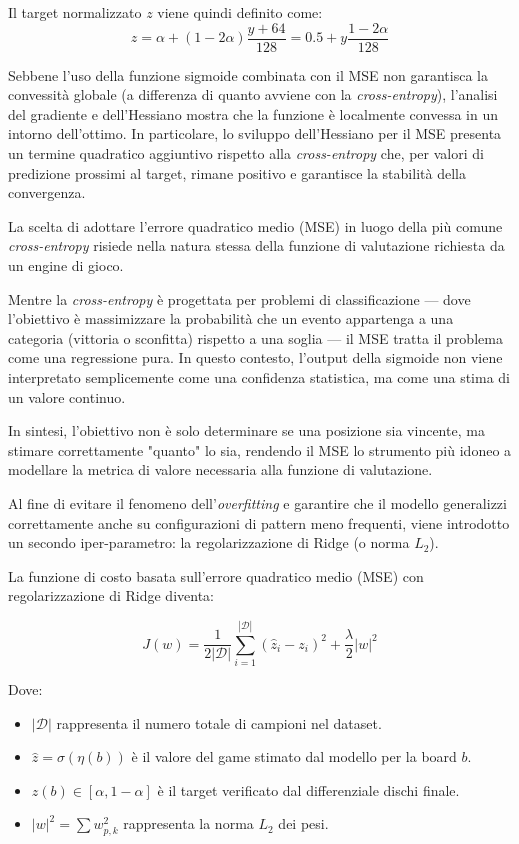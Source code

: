 Il target normalizzato $z$ viene quindi definito come:
\begin{equation}
    z = \alpha + (1 - 2\alpha) \frac{y + 64}{128} = 0.5 + y \frac{1 - 2\alpha}{128}
\end{equation}

Sebbene l'uso della funzione sigmoide combinata con il MSE non garantisca la convessità globale (a differenza di quanto avviene con la \textit{cross-entropy}), l'analisi del gradiente e dell'Hessiano mostra che la funzione è localmente convessa in un intorno dell'ottimo. In particolare, lo sviluppo dell'Hessiano per il MSE presenta un termine quadratico aggiuntivo rispetto alla \textit{cross-entropy} che, per valori di predizione prossimi al target, rimane positivo e garantisce la stabilità della convergenza.

La scelta di adottare l'errore quadratico medio (MSE) in luogo della più comune \textit{cross-entropy} risiede nella natura stessa della funzione di valutazione richiesta da un engine di gioco.

Mentre la \textit{cross-entropy} è progettata per problemi di classificazione — dove l'obiettivo è massimizzare la probabilità che un evento appartenga a una categoria (vittoria o sconfitta) rispetto a una soglia — il MSE tratta il problema come una regressione pura.
In questo contesto, l'output della sigmoide non viene interpretato semplicemente come una confidenza statistica, ma come una stima di un valore continuo.

In sintesi, l'obiettivo non è solo determinare se una posizione sia vincente, ma stimare correttamente "quanto" lo sia, rendendo il MSE lo strumento più idoneo a modellare la metrica di valore necessaria alla funzione di valutazione.

Al fine di evitare il fenomeno dell'\textit{overfitting} e garantire che il modello generalizzi correttamente anche su configurazioni di pattern meno frequenti, viene introdotto un secondo iper-parametro: la regolarizzazione di Ridge (o norma $L_2$).

La funzione di costo basata sull'errore quadratico medio (MSE) con regolarizzazione di Ridge diventa:

\begin{equation}
    J(w) = \frac{1}{2|\mathcal{D}|} \sum_{i=1}^{|\mathcal{D}|} (\hat{z}_i - z_i)^2 + \frac{\lambda}{2} |w|^2
\end{equation}

Dove:
\begin{itemize}
    \item $|\mathcal{D}|$ rappresenta il numero totale di campioni nel dataset.
    \item $\hat{z} = \sigma(\eta(b))$ è il valore del game stimato dal modello per la board $b$.
    \item $z(b) \in [\alpha, 1-\alpha]$ è il target verificato dal differenziale dischi finale.
    \item $|w|^2 = \sum w_{p,k}^2$ rappresenta la norma $L_2$ dei pesi.
\end{itemize}

